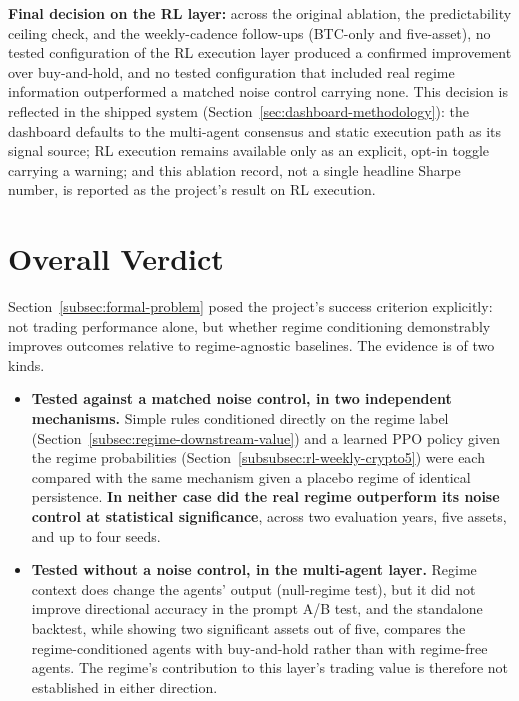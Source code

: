 \textbf{Final decision on the RL layer:} across the original ablation, the predictability ceiling check, and the weekly-cadence follow-ups (BTC-only and five-asset), no tested configuration of the RL execution layer produced a confirmed improvement over buy-and-hold, and no tested configuration that included real regime information outperformed a matched noise control carrying none. This decision is reflected in the shipped system (Section~\ref{sec:dashboard-methodology}): the dashboard defaults to the multi-agent consensus and static execution path as its signal source; RL execution remains available only as an explicit, opt-in toggle carrying a warning; and this ablation record, not a single headline Sharpe number, is reported as the project's result on RL execution.

\section{Overall Verdict}
\label{sec:conclusion-overall}

Section~\ref{subsec:formal-problem} posed the project's success criterion explicitly: not trading performance alone, but whether regime conditioning demonstrably improves outcomes relative to regime-agnostic baselines. The evidence is of two kinds.

\begin{itemize}
    \item \textbf{Tested against a matched noise control, in two independent mechanisms.} Simple rules conditioned directly on the regime label (Section~\ref{subsec:regime-downstream-value}) and a learned PPO policy given the regime probabilities (Section~\ref{subsubsec:rl-weekly-crypto5}) were each compared with the same mechanism given a placebo regime of identical persistence. \textbf{In neither case did the real regime outperform its noise control at statistical significance}, across two evaluation years, five assets, and up to four seeds.
    \item \textbf{Tested without a noise control, in the multi-agent layer.} Regime context does change the agents' output (null-regime test), but it did not improve directional accuracy in the prompt A/B test, and the standalone backtest, while showing two significant assets out of five, compares the regime-conditioned agents with buy-and-hold rather than with regime-free agents. The regime's contribution to this layer's trading value is therefore not established in either direction.
\end{itemize}

